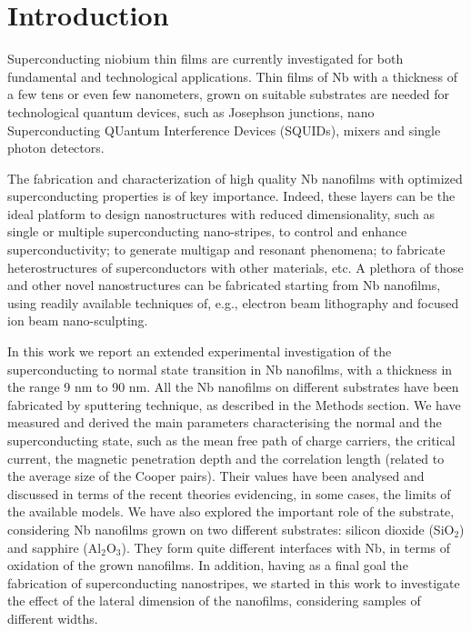 \documentclass[reprint,onecolumn,superscriptaddress,a4paper,nofootinbib,floatfix]{revtex4-1}
\begin{document}
\date{\today}
\flushbottom
\maketitle

\section*{Introduction}
Superconducting niobium thin films are currently investigated for both fundamental and technological applications.
Thin films of Nb with a thickness of a few tens or even few nanometers, grown on suitable substrates are needed for technological quantum devices, such as Josephson junctions, nano Superconducting QUantum Interference Devices (SQUIDs), \cite{Russo:2014} mixers \cite{Karasik} and single photon detectors. \cite {Semenov:2003}

The fabrication and characterization of high quality Nb nanofilms with optimized superconducting properties is of key importance. 
Indeed, these layers can be the ideal platform to design nanostructures with reduced dimensionality, such as single or multiple superconducting nano-stripes, to control and enhance superconductivity; \cite{Perali96,Bianconi97,Bianconi98,Perali2012} to generate multigap and resonant phenomena; \cite{Blatt1,Blatt2,Innocenti2010,PeraliSUST,2DEGPerali,MMAP2015} to fabricate heterostructures of superconductors with other materials, \cite{Buzdin2005} etc. A plethora of those and other novel nanostructures can be fabricated starting from Nb nanofilms, using readily available techniques of, e.g., electron beam lithography and focused ion beam nano-sculpting. \cite{Fretto2013}

In this work we report an extended experimental investigation of the superconducting to normal state transition in Nb nanofilms, with a thickness in the range 9 nm to  90 nm. All the Nb nanofilms on different substrates have been fabricated by sputtering technique, as described in the Methods section.
We have measured and derived the main parameters characterising the normal and the superconducting state, such as the mean free path of charge carriers, the critical current, the magnetic penetration depth and the correlation length (related to the average size of the Cooper pairs). Their values have been analysed and discussed in terms of the recent theories evidencing, in some cases, the limits of the available models. 
We have also explored the important role of the substrate, considering Nb nanofilms grown on two different substrates: silicon dioxide (SiO$_2$) and sapphire (Al$_ 2$O$_3$).
They form quite different interfaces with Nb, in terms of oxidation of the grown nanofilms. In addition, having as a final goal the fabrication of superconducting nanostripes, we started
in this work to investigate the effect of the lateral dimension of the nanofilms, considering samples of different widths.
\end{document}
